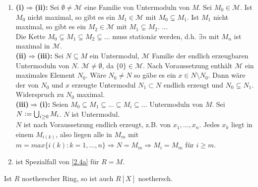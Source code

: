 \documentclass[a4paper, 10pt]{report}
\begin{document}
\begin{Bew} 
  \begin{enumerate}
    \item \textbf{(i)$\Rightarrow$(ii):} Sei $\emptyset \not= \mathcal{M}$ eine
          Familie von Untermoduln von $M$. Sei $M_0 \in \mathcal{M}$. Ist $M_0$
          nicht maximal, so gibt es ein $M_1 \in \mathcal{M}$ mit $M_0
          \subsetneq M_1$. Ist $M_1$ nicht maximal, so gibt es ein $M_2 \in
          \mathcal{M}$ mit $M_1 \subsetneq M_2$. $\dots$\\
          Die Kette $M_0 \subsetneq M_1 \subsetneq M_2 \subsetneq \dots$ muss
          stationär werden, d.h. $\exists n \text{ mit } M_n$ ist maximal in
          $\mathcal{M}$.\\
          \textbf{(ii)$\Rightarrow$(iii):} Sei $N \subseteq M$ ein Untermodul,
          $\mathcal{M}$ Familie der endlich erzeugbaren Untermoduln von $N$.
          $\mathcal{M} \not= \emptyset$, da $\{0\} \in \mathcal{M}$. Nach
          Voraussetzung enthält $\mathcal{M}$ ein maximales Element $N_0$. Wäre
          $N_0 \not= N$ so gäbe es ein $x \in N \setminus N_0$. Dann wäre der
          von $N_0$ und $x$ erzeugte Untermodul $N_1 \subset N$ endlich erzeugt
          und $N_0 \subsetneq N_1$. Widerspruch zu $N_0$ maximal.\\
          \textbf{(iii)$\Rightarrow$(i):} Seien $M_0 \subseteq M_1 \subseteq
          \dots \subseteq M_i \subseteq \dots$ Untermoduln von $M$.
          Sei  $N \mathrel{\mathop:}= \bigcup_{i \ge 0} M_i$. $N$ ist Untermodul.\\
          $N$ ist nach Voraussetzung endlich erzeugt, z.B. von $ x_1, \dots ,
          x_n$. Jedes $x_k$ liegt in einem $M_{i(k)}$, also liegen alle in $M_m$
          mit $m = max\{i(k): k = 1, \dots , n\} \Rightarrow N = M_m \Rightarrow
          M_i = M_m$ für $i \ge m$.
    \item ist Spezialfall von \ref{2.4a} für $R = M$.
  \end{enumerate}
\end{Bew}

\begin{Satz}
\label{Satz4}
  Ist $R$ noetherscher Ring, so ist auch $R[X]$ noethersch.
\end{Satz}
\end{document}
